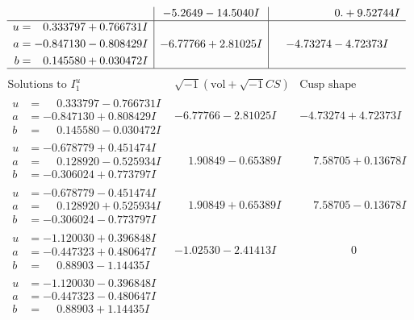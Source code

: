 \documentclass[1p]{elsarticle_modified}
\theoremstyle{definition}
\newcommand{\I}{\sqrt{-1}}
\begin{document}
$$\begin{array}{c|c|c}
 & -5.2649 - 14.5040 I & \phantom{-0.000000 -}0. + 9.52744 I \\ \hline\begin{aligned}
u &= \phantom{-}0.333797 + 0.766731 I \\
a &= -0.847130 - 0.808429 I \\
b &= \phantom{-}0.145580 + 0.030472 I\end{aligned}
 & -6.77766 + 2.81025 I & -4.73274 - 4.72373 I\\
 \hline 
 \end{array}$$\newpage$$\begin{array}{c|c|c}  
\text{Solutions to }I^u_{1}& \I (\text{vol} + \sqrt{-1}CS) & \text{Cusp shape}\\
 \hline 
\begin{aligned}
u &= \phantom{-}0.333797 - 0.766731 I \\
a &= -0.847130 + 0.808429 I \\
b &= \phantom{-}0.145580 - 0.030472 I\end{aligned}
 & -6.77766 - 2.81025 I & -4.73274 + 4.72373 I \\ \hline\begin{aligned}
u &= -0.678779 + 0.451474 I \\
a &= \phantom{-}0.128920 - 0.525934 I \\
b &= -0.306024 + 0.773797 I\end{aligned}
 & \phantom{-}1.90849 - 0.65389 I & \phantom{-}7.58705 + 0.13678 I \\ \hline\begin{aligned}
u &= -0.678779 - 0.451474 I \\
a &= \phantom{-}0.128920 + 0.525934 I \\
b &= -0.306024 - 0.773797 I\end{aligned}
 & \phantom{-}1.90849 + 0.65389 I & \phantom{-}7.58705 - 0.13678 I \\ \hline\begin{aligned}
u &= -1.120030 + 0.396848 I \\
a &= -0.447323 + 0.480647 I \\
b &= \phantom{-}0.88903 - 1.14435 I\end{aligned}
 & -1.02530 - 2.41413 I & \phantom{-0.000000 } 0 \\ \hline\begin{aligned}
u &= -1.120030 - 0.396848 I \\
a &= -0.447323 - 0.480647 I \\
b &= \phantom{-}0.88903 + 1.14435 I\end{aligned}

\end{array}$$
\end{document}
